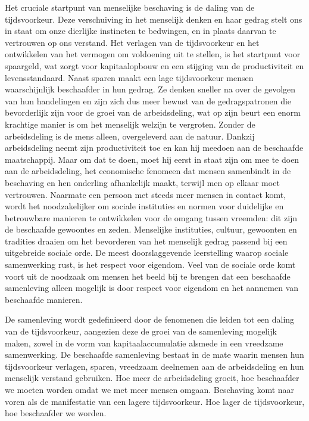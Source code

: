 Het cruciale startpunt van menselijke beschaving is de daling van de tijdsvoorkeur. Deze verschuiving in het menselijk denken en haar gedrag stelt ons in staat om onze dierlijke instincten te bedwingen, en in plaats daarvan te vertrouwen op ons verstand. Het verlagen van de tijdsvoorkeur en het ontwikkelen van het vermogen om voldoening uit te stellen, is het startpunt voor spaargeld, wat zorgt voor kapitaalopbouw en een stijging van de productiviteit en levensstandaard. Naast sparen maakt een lage tijdsvoorkeur mensen waarschijnlijk beschaafder in hun gedrag. Ze denken sneller na over de gevolgen van hun handelingen en zijn zich dus meer bewust van de gedragspatronen die bevorderlijk zijn voor de groei van de arbeidsdeling, wat op zijn beurt een enorm krachtige manier is om het menselijk welzijn te vergroten. Zonder de arbeidsdeling is de mens alleen, overgeleverd aan de natuur. Dankzij arbeidsdeling neemt zijn productiviteit toe en kan hij meedoen aan de beschaafde maatschappij. Maar om dat te doen, moet hij eerst in staat zijn om mee te doen aan de arbeidsdeling, het economische fenomeen dat mensen samenbindt in de beschaving en hen onderling afhankelijk maakt, terwijl men op elkaar moet vertrouwen. Naarmate een persoon met steeds meer mensen in contact komt, wordt het noodzakelijker om sociale instituties en normen voor duidelijke en betrouwbare manieren te ontwikkelen voor de omgang tussen vreemden: dit zijn de beschaafde gewoontes en zeden. Menselijke instituties, cultuur, gewoonten en tradities draaien om het bevorderen van het menselijk gedrag passend bij een uitgebreide sociale orde. De meest doorslaggevende leerstelling waarop sociale samenwerking rust, is het respect voor eigendom. Veel van de sociale orde komt voort uit de noodzaak om mensen het beeld bij te brengen dat een beschaafde samenleving alleen mogelijk is door respect voor eigendom en het aannemen van beschaafde manieren.

De samenleving wordt gedefinieerd door de fenomenen die leiden tot een daling van de tijdsvoorkeur, aangezien deze de groei van de samenleving mogelijk maken, zowel in de vorm van kapitaalaccumulatie alsmede in een vreedzame samenwerking. De beschaafde samenleving bestaat in de mate waarin mensen hun tijdsvoorkeur verlagen, sparen, vreedzaam deelnemen aan de arbeidsdeling en hun menselijk verstand gebruiken. Hoe meer de arbeidsdeling groeit, hoe beschaafder we moeten worden omdat we met meer mensen omgaan. Beschaving komt naar voren als de manifestatie van een lagere tijdsvoorkeur. Hoe lager de tijdsvoorkeur, hoe beschaafder we worden.


